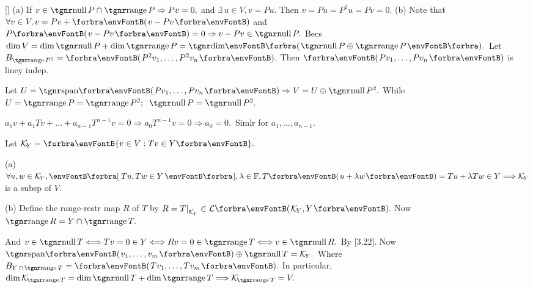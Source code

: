 [\Sbra]{
}(a) If $v\in\null P\cap\range P\Rightarrow Pv=0,$ and $\exists\,u\in V,v=Pu.$ Then $v=Pu=P^2 u=Pv=0.$\parSol{}
(b) Note that $\forall v\in V,v=Pv+\Par{v-Pv}$ and $P\Par{v-Pv}=0\Rightarrow v-Pv\in\null P.$\parSol{\Hb}
\Or Becs $\dim V=\dim\null P+\dim\range P=\Dim\BigPar{\null P\oplus\range P}.$\PfEnd{\vspace{4pt}}\quad
\Or {} \;Let $B_{\range P^2}=\Par{P^2 v_1,\dots,P^2 v_n}.$ Then $\Par{Pv_1,\dots,Pv_n}$ is liney indep.\par\quad
Let $U=\Span{Pv_1,\dots,Pv_n}\Rightarrow V=U\oplus\null P^2.$ \;While $U=\range P=\range P^2;\;\;\null P=\null P^2.$\PfEnd
\SepLine

$a_0v+a_1Tv+\dots+a_{n-1}T^{n-1}v=0\Rightarrow a_0T^{n-1}v=0\Rightarrow a_0=0.$ \,Simlr for $a_1,\dots,a_{n-1}.$\PfEnd
\SepLine

Let $\mathcal{K}_{\!Y}=\Bra{v\in V: Tv\in Y}.$\par\quad
(a) $\forall u,w\in\mathcal{K}_{\!Y},\Sbra{\,Tu,Tw\in Y\,},\lambda\in\Fbb,T\Par{u+\lambda w}=Tu+\lambda Tw\in Y\Longrightarrow \mathcal{K}_{\!Y}$ is a subsp of $V.$\par\vspace{2pt}\quad
(b) Define the range-restr map $R$ of $T$ by $R=T\mmid_{\mathcal{K}_{\!Y}}\in\Lm{\mathcal{K}_{\!Y},Y}.$ Now $\range R=Y\cap \range T.$\par\quad\Hb
And $v\in\null T\Longleftrightarrow Tv=0\in Y\Longleftrightarrow Rv=0\in\range T\Longleftrightarrow v\in\null R.$ By [3.22].\PfEnd\vspace{2pt}
\AComm Now $\Span{v_1,\dots,v_m}\oplus\null T=\mathcal{K}_{\!Y}.$ {Where $B_{Y\,\cap\,\range T}=\Par{Tv_1,\dots,Tv_m}.$}\vspace{0pt}\parCom
In particular, $\dim\mathcal{K}_{\!\range T}=\dim\null T+\dim\range T\Longrightarrow\mathcal{K}_{\!\range T}=V.$
\SepLine

